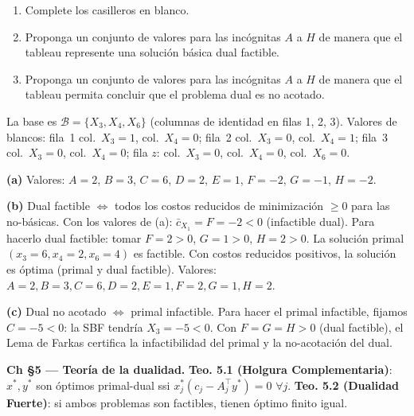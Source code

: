 \documentclass[12pt]{article}
\theoremstyle{plain}
\begin{document}
\begin{enumerate}[label=\alph*)]
      \item Complete los casilleros en blanco.

      \item Proponga un conjunto de valores para las incógnitas $A$ a $H$ de manera que el
            tableau represente una solución básica dual factible.

      \item Proponga un conjunto de valores para las incógnitas $A$ a $H$ de manera que el
            tableau permita concluir que el problema dual es no acotado.
\end{enumerate}

\begin{solucion}

La base es $\mathcal{B}=\{X_3,X_4,X_6\}$ (columnas de identidad en filas 1, 2, 3). Valores de blancos: fila~1 col.~$X_3=1$, col.~$X_4=0$; fila~2 col.~$X_3=0$, col.~$X_4=1$; fila~3 col.~$X_3=0$, col.~$X_4=0$; fila $z$: col.~$X_3=0$, col.~$X_4=0$, col.~$X_6=0$.

\noindent\textbf{(a)} Valores: $A=2$, $B=3$, $C=6$, $D=2$, $E=1$, $F=-2$, $G=-1$, $H=-2$.

\noindent\textbf{(b)} Dual factible $\Leftrightarrow$ todos los costos reducidos de minimización $\geq 0$ para las no-básicas. Con los valores de (a): $\bar{c}_{X_1}=F=-2<0$ (infactible dual). Para hacerlo dual factible: tomar $F=2>0$, $G=1>0$, $H=2>0$. La solución primal $(x_3=6,x_4=2,x_6=4)$ es factible. Con costos reducidos positivos, la solución es óptima (primal y dual factible). Valores: $A=2, B=3, C=6, D=2, E=1, F=2, G=1, H=2$.

\noindent\textbf{(c)} Dual no acotado $\Leftrightarrow$ primal infactible. Para hacer el primal infactible, fijamos $C=-5<0$: la SBF tendría $X_3=-5<0$. Con $F=G=H>0$ (dual factible), el Lema de Farkas certifica la infactibilidad del primal y la no-acotación del dual.

\end{solucion}

\begin{teofund}
\textbf{Ch §5 — Teoría de la dualidad.} \textbf{Teo. 5.1 (Holgura Complementaria)}: $x^*,y^*$ son óptimos primal-dual ssi $x^*_j(c_j-A_j^\top y^*)=0$ $\forall j$. \textbf{Teo. 5.2 (Dualidad Fuerte)}: si ambos problemas son factibles, tienen óptimo finito igual.
\end{teofund}

\bigskip
\end{document}
